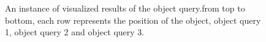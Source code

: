 \begin{figure}[h!]
	
	\caption[An instance of Visualized results of the object query]{An instance of visualized results of the object query.from top to bottom, each row represents the position of the object, object query 1, object query 2 and object query 3.}
	\label{fig:tennis}
\end{figure}

